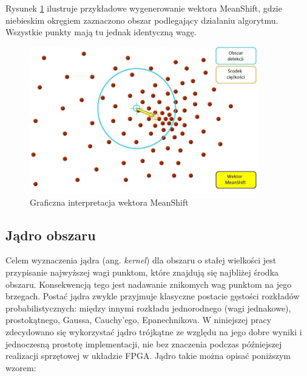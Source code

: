 Rysunek  \ref{fig:ms_vector} ilustruje przykładowe wygenerowanie wektora MeanShift, gdzie niebieskim okręgiem zaznaczono obszar podlegający działaniu algorytmu. 
Wszystkie punkty mają tu jednak identyczną wagę.
\begin{figure}[h]
	\centering
	\includegraphics[width=10cm]{2_meanshift.jpg}
	\caption{Graficzna interpretacja wektora MeanShift \cite{Egorov}}
	\label{fig:ms_vector}
\end{figure}

\subsection{Jądro obszaru}

Celem wyznaczenia jądra (ang. \textit{kernel}) dla obszaru o stałej wielkości jest przypisanie najwyższej wagi punktom, które znajdują się najbliżej środka obszaru. 
Konsekwencją tego jest nadawanie znikomych wag punktom na jego brzegach. %
Postać jądra zwykle przyjmuje klasyczne postacie gęstości rozkładów probabilistycznych: między innymi rozkładu jednorodnego (wagi jednakowe), prostokątnego, Gaussa, Cauchy'ego, Epanechnikova. 
W niniejszej pracy zdecydowano się wykorzystać jądro trójkątne ze względu na jego dobre wyniki i jednoczesną prostotę implementacji, nie bez znaczenia podczas późniejszej realizacji sprzętowej w układzie FPGA. 
Jądro takie można opisać poniższym wzorem:


